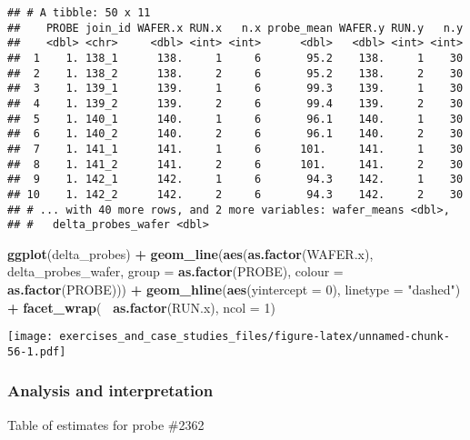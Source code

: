 \documentclass[]{book}
\newenvironment{Shaded}{\begin{snugshade}}{\end{snugshade}}
\newcommand{\DataTypeTok}[1]{\textcolor[rgb]{0.13,0.29,0.53}{#1}}
\newcommand{\DecValTok}[1]{\textcolor[rgb]{0.00,0.00,0.81}{#1}}
\newcommand{\KeywordTok}[1]{\textcolor[rgb]{0.13,0.29,0.53}{\textbf{#1}}}
\newcommand{\NormalTok}[1]{#1}
\newcommand{\OperatorTok}[1]{\textcolor[rgb]{0.81,0.36,0.00}{\textbf{#1}}}
\newcommand{\StringTok}[1]{\textcolor[rgb]{0.31,0.60,0.02}{#1}}
\theoremstyle{definition}
\theoremstyle{definition}
\theoremstyle{definition}
\theoremstyle{remark}
\begin{document}
\begin{verbatim}
## # A tibble: 50 x 11
##    PROBE join_id WAFER.x RUN.x   n.x probe_mean WAFER.y RUN.y   n.y
##    <dbl> <chr>     <dbl> <int> <int>      <dbl>   <dbl> <int> <int>
##  1    1. 138_1      138.     1     6       95.2    138.     1    30
##  2    1. 138_2      138.     2     6       95.2    138.     2    30
##  3    1. 139_1      139.     1     6       99.3    139.     1    30
##  4    1. 139_2      139.     2     6       99.4    139.     2    30
##  5    1. 140_1      140.     1     6       96.1    140.     1    30
##  6    1. 140_2      140.     2     6       96.1    140.     2    30
##  7    1. 141_1      141.     1     6      101.     141.     1    30
##  8    1. 141_2      141.     2     6      101.     141.     2    30
##  9    1. 142_1      142.     1     6       94.3    142.     1    30
## 10    1. 142_2      142.     2     6       94.3    142.     2    30
## # ... with 40 more rows, and 2 more variables: wafer_means <dbl>,
## #   delta_probes_wafer <dbl>
\end{verbatim}

\begin{Shaded}
\begin{Highlighting}[]
\KeywordTok{ggplot}\NormalTok{(delta_probes) }\OperatorTok{+}
\StringTok{  }\KeywordTok{geom_line}\NormalTok{(}\KeywordTok{aes}\NormalTok{(}\KeywordTok{as.factor}\NormalTok{(WAFER.x), delta_probes_wafer, }\DataTypeTok{group =} \KeywordTok{as.factor}\NormalTok{(PROBE), }\DataTypeTok{colour =} \KeywordTok{as.factor}\NormalTok{(PROBE))) }\OperatorTok{+}
\StringTok{  }\KeywordTok{geom_hline}\NormalTok{(}\KeywordTok{aes}\NormalTok{(}\DataTypeTok{yintercept =} \DecValTok{0}\NormalTok{), }\DataTypeTok{linetype =} \StringTok{"dashed"}\NormalTok{) }\OperatorTok{+}
\StringTok{  }\KeywordTok{facet_wrap}\NormalTok{(}\OperatorTok{~}\StringTok{ }\KeywordTok{as.factor}\NormalTok{(RUN.x), }\DataTypeTok{ncol =} \DecValTok{1}\NormalTok{) }
\end{Highlighting}
\end{Shaded}

\texttt{[image: exercises\_and\_case\_studies\_files/figure-latex/unnamed-chunk-56-1.pdf]}

\hypertarget{analysis-and-interpretation}{%
\subsubsection{Analysis and
interpretation}\label{analysis-and-interpretation}}

Table of estimates for probe \#2362
\end{document}
